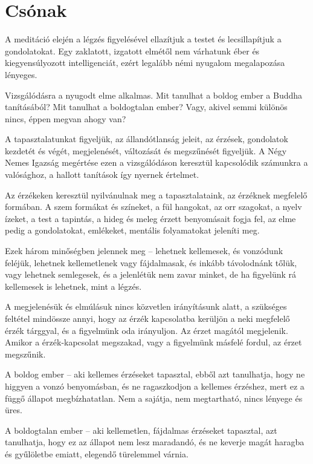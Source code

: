 \hypertarget{csuxf3nak-1}{%
\chapter{Csónak}\label{csuxf3nak-1}}

A meditáció elején a légzés figyelésével ellazítjuk a testet és
lecsillapítjuk a gondolatokat. Egy zaklatott, izgatott elmétől nem
várhatunk éber és kiegyensúlyozott intelligenciát, ezért legalább némi
nyugalom megalapozása lényeges.

Vizsgálódásra a nyugodt elme alkalmas. Mit tanulhat a boldog ember a
Buddha tanításából? Mit tanulhat a boldogtalan ember? Vagy, akivel semmi
különös nincs, éppen megvan ahogy van?

A tapasztalatunkat figyeljük, az állandótlanság jeleit, az érzések,
gondolatok kezdetét és végét, megjelenését, változását és megszűnését
figyeljük. A Négy Nemes Igazság megértése ezen a vizsgálódáson keresztül
kapcsolódik számunkra a valósághoz, a hallott tanítások így nyernek
értelmet.

Az érzékeken keresztül nyilvánulnak meg a tapasztalataink, az érzéknek
megfelelő formában. A szem formákat és színeket, a fül hangokat, az orr
szagokat, a nyelv ízeket, a test a tapintás, a hideg és meleg érzett
benyomásait fogja fel, az elme pedig a gondolatokat, emlékeket, mentális
folyamatokat jeleníti meg.

Ezek három minőségben jelennek meg -- lehetnek kellemesek, és vonzódunk
feléjük, lehetnek kellemetlenek vagy fájdalmasak, és inkább távolodnánk
tőlük, vagy lehetnek semlegesek, és a jelenlétük nem zavar minket, de ha
figyelünk rá kellemesek is lehetnek, mint a légzés.

A megjelenésük és elmúlásuk nincs közvetlen irányításunk alatt, a
szükséges feltétel mindössze annyi, hogy az érzék kapcsolatba kerüljön a
neki megfelelő érzék tárggyal, és a figyelmünk oda irányuljon. Az érzet
magától megjelenik. Amikor a érzék-kapcsolat megszakad, vagy a
figyelmünk másfelé fordul, az érzet megszűnik.

A boldog ember -- aki kellemes érzéseket tapasztal, ebből azt
tanulhatja, hogy ne higgyen a vonzó benyomásban, és ne ragaszkodjon a
kellemes érzéshez, mert ez a függő állapot megbízhatatlan. Nem a
sajátja, nem megtartható, nincs lényege és üres.

A boldogtalan ember -- aki kellemetlen, fájdalmas érzéseket tapasztal,
azt tanulhatja, hogy ez az állapot nem lesz maradandó, és ne keverje
magát haragba és gyűlöletbe emiatt, elegendő türelemmel várnia.


